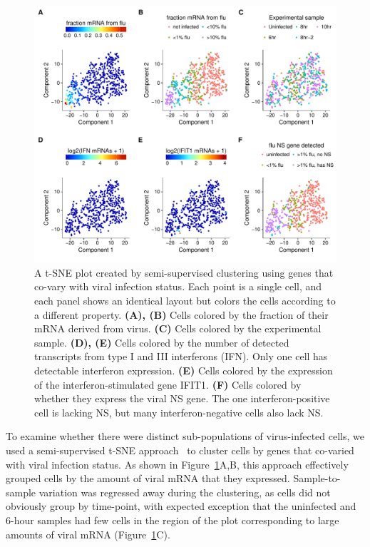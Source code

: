 \documentclass[9pt,lineno]{elife}
\begin{document}
\begin{figure}
\centerline{\includegraphics[width=0.8\linewidth]{figures/p_small_tsne_merge.pdf}}
\caption{\label{fig:tsne}
A t-SNE plot created by semi-supervised clustering using genes that co-vary with viral infection status.
Each point is a single cell, and each panel shows an identical layout but colors the cells according to a different property.
{\bf (A), (B)}
Cells colored by the fraction of their mRNA derived from virus.
{\bf (C)}
Cells colored by the experimental sample.
{\bf (D), (E)}
Cells colored by the number of detected transcripts from type I and III interferons (IFN).
Only one cell has detectable interferon expression.
{\bf (E)}
Cells colored by the expression of the interferon-stimulated gene IFIT1.
{\bf (F)}
Cells colored by whether they express the viral NS gene.
The one interferon-positive cell is lacking NS, but many interferon-negative cells also lack NS.
}

\end{figure}

To examine whether there were distinct sub-populations of virus-infected cells, we used a semi-supervised t-SNE approach~\citep{VanderMaaten:2008tm} to cluster cells by genes that co-varied with viral infection status.
As shown in Figure~\ref{fig:tsne}A,B, this approach effectively grouped cells by the amount of viral mRNA that they expressed.
Sample-to-sample variation was regressed away during the clustering, as cells did not obviously group by time-point, with expected exception that the uninfected and 6-hour samples had few cells in the region of the plot corresponding to large amounts of viral mRNA (Figure~\ref{fig:tsne}C).
\end{document}
